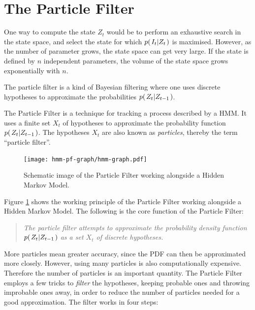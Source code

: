%
%

%
%

%
%


\section{The Particle Filter}

One way to compute the state $Z_t$ would be to perform an exhaustive search in the state space, and select the state for which $p{(\left. I_t \middle\vert Z_t \right.)}$ is maximised. However, as the number of parameter grows, the state space can get very large. If the state is defined by $n$ independent parameters, the volume of the state space grows exponentially with $n$.

The particle filter is a kind of Bayesian filtering where one uses discrete hypotheses to approximate the probabilities $p{(\left. Z_t \middle\vert Z_{t-1} \right.)}$.

The Particle Filter is a technique for tracking a process described by a HMM. It uses a finite set $X_t$ of hypotheses to approximate the probability function $p{(\left. Z_t \middle\vert Z_{t-1} \right.)}$. The hypotheses $X_t$ are also known as \emph{particles}, thereby the term ``particle filter''.

\begin{figure}
  \centering
  \texttt{[image: hmm-pf-graph/hmm-graph.pdf]}
  \caption{Schematic image of the Particle Filter working alongside a Hidden Markov Model.}
  \label{fig:hmm-graph}
\end{figure}

Figure \ref{fig:hmm-graph} shows the working principle of the Particle Filter working alongside a Hidden Markov Model. The following is the core function of the Particle Filter:

\begin{quote}
  \emph{The particle filter attempts to approximate the probability density function $p{(\left. Z_t \middle\vert Z_{t-1} \right.)}$ as a set $X_t$ of discrete hypotheses.}
\end{quote}

More particles mean greater accuracy, since the PDF can then be approximated more closely. However, using many particles is also computationally expensive. Therefore the number of particles is an important quantity. The Particle Filter employs a few tricks to \emph{filter} the hypotheses, keeping probable ones and throwing improbable ones away, in order to reduce the number of particles needed for a good approximation. The filter works in four steps:

